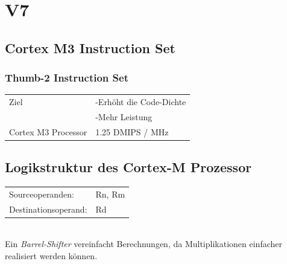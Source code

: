 \section{V7}
\subsection{Cortex M3 Instruction Set}
\begin{multicols}{2}  
    \subsubsection{Thumb-2 Instruction Set}
    \begin{tabular}{l l}
        Ziel&-Erhöht die Code-Dichte\\
            &  -Mehr Leistung\\ 
        Cortex M3 Processor  & 1.25 DMIPS / MHz\\ 
    \end{tabular} 
    
    \begin{minipage}{\textwidth}
        \subsection{Logikstruktur des Cortex-M Prozessor}
        \begin{tabular}{ll} 
            Sourceoperanden:& Rn, Rm \\ 
            Destinationsoperand:& Rd  \\ 
        \end{tabular} \\
        Ein \textit{Barrel-Shifter} vereinfacht Berechnungen,\newline
        da Multiplikationen einfacher realisiert werden können.
    \end{minipage}
\end{multicols}

